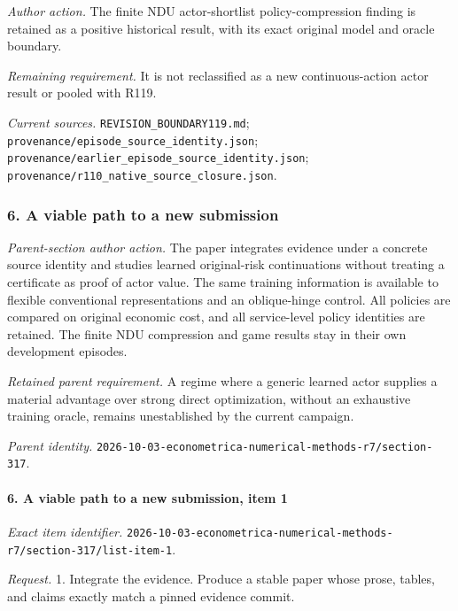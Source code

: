 \par\emph{Author action.} The finite NDU actor-shortlist policy-compression finding is retained as a positive historical result, with its exact original model and oracle boundary.

\par\emph{Remaining requirement.} It is not reclassified as a new continuous-action actor result or pooled with R119.

\par\emph{Current sources.} \nolinkurl{REVISION_BOUNDARY119.md}; \nolinkurl{provenance/episode_source_identity.json}; \nolinkurl{provenance/earlier_episode_source_identity.json}; \nolinkurl{provenance/r110_native_source_closure.json}.

\subsubsection{6. A viable path to a new submission}

\emph{Parent-section author action.} The paper integrates evidence under a concrete source identity and studies learned original-risk continuations without treating a certificate as proof of actor value. The same training information is available to flexible conventional representations and an oblique-hinge control. All policies are compared on original economic cost, and all service-level policy identities are retained. The finite NDU compression and game results stay in their own development episodes.

\par\emph{Retained parent requirement.} A regime where a generic learned actor supplies a material advantage over strong direct optimization, without an exhaustive training oracle, remains unestablished by the current campaign.

\par\emph{Parent identity.} \nolinkurl{2026-10-03-econometrica-numerical-methods-r7/section-317}.

\paragraph{6. A viable path to a new submission, item 1}

\emph{Exact item identifier.} \nolinkurl{2026-10-03-econometrica-numerical-methods-r7/section-317/list-item-1}.

\par\emph{Request.} 1. Integrate the evidence. Produce a stable paper whose prose, tables, and claims exactly match a pinned evidence commit.

